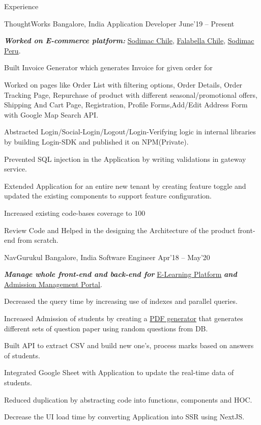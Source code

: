 \documentclass{resume} %
\begin{document}
\begin{rSection}{Experience}

  \begin{rWorkSection}{\Large ThoughtWorks}
                     {Bangalore, India}
                     {Application Developer}
                     {June'19 -- Present} {
    {\it\bf Worked on E-commerce platform:} \href{https://www.sodimac.cl/sodimac-cl/}{Sodimac Chile}, \href{https://www.falabella.com/falabella-cl/}{Falabella Chile},  \href{https://www.sodimac.com.pe/sodimac-pe/}{Sodimac Peru}.
    \item Built Invoice Generator which generates Invoice for given order for  
    \item Worked on pages like Order List with filtering options, Order Details, Order Tracking Page, Repurchase of product with different seasonal/promotional offers, Shipping And Cart Page, Registration, Profile Forms,Add/Edit Address Form with Google Map Search API.
    \item Abstracted Login/Social-Login/Logout/Login-Verifying logic in internal libraries by building Login-SDK and published it on NPM(Private).
    \item Prevented SQL injection in the Application by writing validations in gateway service.
    \item Extended Application for an entire new tenant by creating feature toggle and updated the existing components to support feature configuration.
    \item Increased existing code-bases coverage to 100%
    \item Review Code and Helped in the designing the Architecture of the product front-end from scratch.
  }
  \end{rWorkSection}

  \begin{rWorkSection}{\Large NavGurukul}
                     {Bangalore, India}
                     {Software Engineer}
                     {Apr'18 -- May'20} {
    {\it\bf Manage whole front-end and back-end for} \href{https://saral.navgurukul.org/}{E-Learning Platform} {\it\bf and} \href{http://admissions.navgurukul.org/}{Admission Management Portal}. 
    \item Decreased the query time by increasing use of indexes and parallel queries.
    \item Increased Admission of students by creating a \href{https://github.com/amarkrsinha1997/question-pdf-generator}{PDF generator} that generates different sets of question paper using random questions from DB.
    \item Built API to extract CSV and build new one's, process marks based on answers of students.
    \item Integrated Google Sheet with Application to update the real-time data of students.
    \item Reduced duplication by abstracting code into functions, components and HOC.
    \item Decrease the UI load time by converting Application into SSR using NextJS.
  }
  \end{rWorkSection}

\end{rSection}
\end{document}
